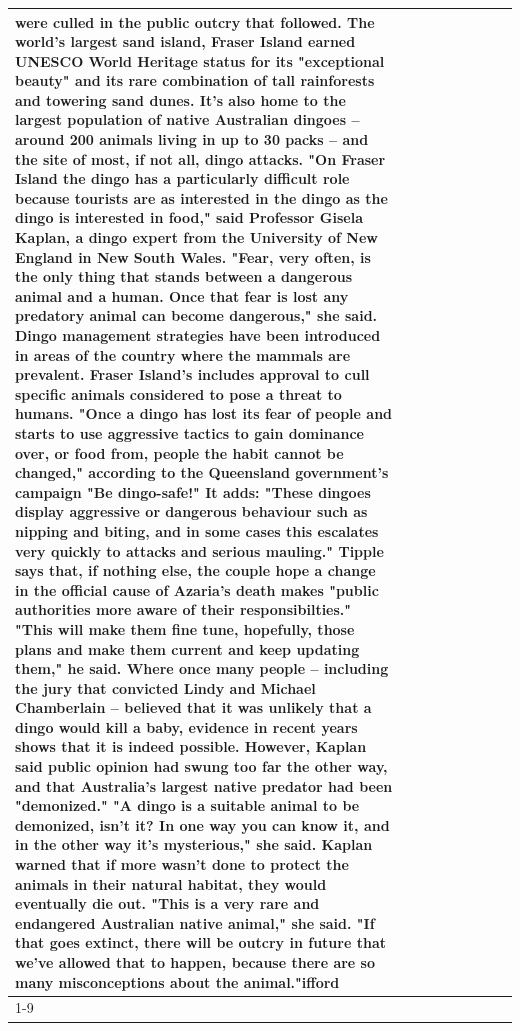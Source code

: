 \begin{table}[H]
\begin{tabular}{lllrlllll}
were culled in the public outcry that followed. The world's largest sand island, Fraser Island earned UNESCO World Heritage status for its "exceptional beauty" and its rare combination of tall rainforests and towering sand dunes. It's also home to the largest population of native Australian dingoes -- around 200 animals living in up to 30 packs -- and the site of most, if not all, dingo attacks. "On Fraser Island the dingo has a particularly difficult role because tourists are as interested in the dingo as the dingo is interested in food," said Professor Gisela Kaplan, a dingo expert from the University of New England in New South Wales. "Fear, very often, is the only thing that stands between a dangerous animal and a human. Once that fear is lost any predatory animal can become dangerous," she said. Dingo management strategies have been introduced in areas of the country where the mammals are prevalent. Fraser Island's includes approval to cull specific animals considered to pose a threat to humans. "Once a dingo has lost its fear of people and starts to use aggressive tactics to gain dominance over, or food from, people the habit cannot be changed," according to the Queensland government's campaign "Be dingo-safe!" It adds: "These dingoes display aggressive or dangerous behaviour such as nipping and biting, and in some cases this escalates very quickly to attacks and serious mauling." Tipple says that, if nothing else, the couple hope a change in the official cause of Azaria's death makes "public authorities more aware of their responsibilties." "This will make them fine tune, hopefully, those plans and make them current and keep updating them," he said. Where once many people -- including the jury that convicted Lindy and Michael Chamberlain -- believed that it was unlikely that a dingo would kill a baby, evidence in recent years shows that it is indeed possible. However, Kaplan said public opinion had swung too far the other way, and that Australia's largest native predator had been "demonized." "A dingo is a suitable animal to be demonized, isn't it? In one way you can know it, and in the other way it's mysterious," she said. Kaplan warned that if more wasn't done to protect the animals in their natural habitat, they would eventually die out. "This is a very rare and endangered Australian native animal," she said. "If that goes extinct, there will be outcry in future that we've allowed that to happen, because there are so many misconceptions about the animal."ifford \\
\cline{1-9}

\end{tabular}
\end{table}
